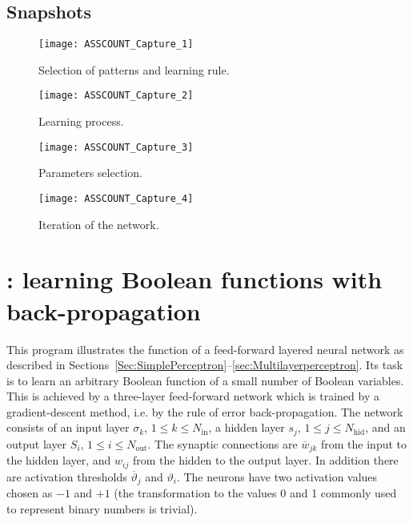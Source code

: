 \subsection{Snapshots}
\begin{figure}[h!t]
\centering
\texttt{[image: ASSCOUNT\_Capture\_1]}
\caption{Selection of patterns and learning rule.}\label{ASSCOUNT_Capture_1}
\end{figure}
\begin{figure}[h!t]
\centering
\texttt{[image: ASSCOUNT\_Capture\_2]}
\caption{Learning process.}\label{ASSCOUNT_Capture_2}
\end{figure}
\begin{figure}[h!t]
\centering
\texttt{[image: ASSCOUNT\_Capture\_3]}
\caption{Parameters selection.}\label{ASSCOUNT_Capture_3}
\end{figure}
\begin{figure}[h!t]
\centering
\texttt{[image: ASSCOUNT\_Capture\_4]}
\caption{Iteration of the network.}\label{ASSCOUNT_Capture_4}
\end{figure}
\clearpage

\section[PERBOOL: learning Boolean functions with back-propagation]{: learning Boolean functions with back-propagation}\label{chap:PERBOOL}
This program illustrates the function of a feed-forward layered neural network as described in Sections~\ref{Sec:SimplePerceptron}--\ref{sec:Multilayerperceptron}. Its task is to learn an arbitrary Boolean function of a small number of Boolean variables. This is achieved by a three-layer feed-forward network which is trained by a gradient-descent method, i.e. by the rule of error back-propagation. The network consists of an input layer $\sigma_k$, $1\leq k\leq N_{\text{in}}$, a hidden layer $s_j$, $1\leq j\leq N_{\text{hid}}$, and an output layer $S_i$, $1\leq i\leq N_{\text{out}}$. The synaptic connections are $\overline{w}_{jk}$ from the input to the hidden layer, and $w_{ij}$ from the hidden to the output layer. In addition there are activation thresholds $\overline{\vartheta}_j$ and $\vartheta_i$. The neurons have two activation values chosen as $-1$ and $+1$ (the transformation to the values 0 and 1 commonly used to represent binary numbers is trivial).

